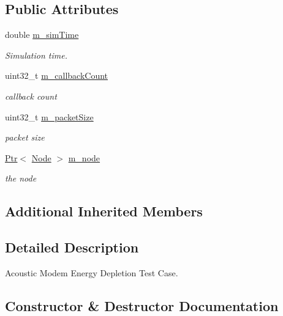 \subsection*{Public Attributes}
\begin{DoxyCompactItemize}
\item 
double \hyperlink{classAcousticModemEnergyDepletionTestCase_ae081c5442fcc0406d5d002c20540e0a5}{m\+\_\+sim\+Time}
\begin{DoxyCompactList}\small\item\em Simulation time. \end{DoxyCompactList}\item 
uint32\+\_\+t \hyperlink{classAcousticModemEnergyDepletionTestCase_aab78b851effc5b78aabd4f82cf0007e2}{m\+\_\+callback\+Count}
\begin{DoxyCompactList}\small\item\em callback count \end{DoxyCompactList}\item 
uint32\+\_\+t \hyperlink{classAcousticModemEnergyDepletionTestCase_a27cef9a0ab916df25d00c58793619087}{m\+\_\+packet\+Size}
\begin{DoxyCompactList}\small\item\em packet size \end{DoxyCompactList}\item 
\hyperlink{classns3_1_1Ptr}{Ptr}$<$ \hyperlink{classns3_1_1Node}{Node} $>$ \hyperlink{classAcousticModemEnergyDepletionTestCase_aad8287a51fe09423d58935484fb3ac6d}{m\+\_\+node}
\begin{DoxyCompactList}\small\item\em the node \end{DoxyCompactList}\end{DoxyCompactItemize}
\subsection*{Additional Inherited Members}


\subsection{Detailed Description}
Acoustic Modem Energy Depletion Test Case. 

\subsection{Constructor \& Destructor Documentation}
